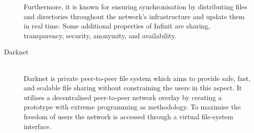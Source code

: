 \begin{description}
	Furthermore, it is known for ensuring synchronisation by distributing files and directories throughout the network's infrastructure and update them in real time. Some additional properties of Infinit are sharing, transparency, security, anonymity, and availability.
	\item[Darknet]\-\\
	Darknet \cite{Ledung:2010wq} is private peer-to-peer file system which aims to provide safe, fast, and scalable file sharing without constraining the users in this aspect. It utilises a decentralised peer-to-peer network overlay by creating a prototype with extreme programming as methodology. To maximise the freedom of users the network is accessed through a virtual file-system interface.
\end{description}
